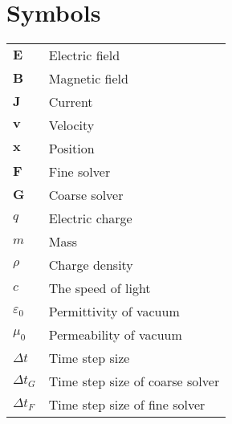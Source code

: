 \documentclass[master=wit, english]{kulemt}
\begin{document}
\section*{Symbols}
\begin{flushleft}
  \renewcommand{\arraystretch}{1.1}
  \begin{tabularx}{\textwidth}{@{}p{12mm}X@{}}
    $\textbf{E}$    & Electric field \\
    $\textbf{B}$   & Magnetic field \\
    $\textbf{J}$ & Current\\
    $\textbf{v}$   & Velocity \\
    $\textbf{x}$   & Position \\
    $\textbf{F}$ & Fine solver \\
    $\textbf{G}$ & Coarse solver \\
    $q$ & Electric charge\\
    $m$ & Mass\\
    $\rho$ & Charge density\\
    $c$ & The speed of light\\
    $\varepsilon_0$ & Permittivity of vacuum\\
    $\mu_0$ & Permeability of vacuum\\
    $\Delta t$ & Time step size\\
    $\Delta t_G$ & Time step size of coarse solver\\
    $\Delta t_F$ & Time step size of fine solver\\
    
  \end{tabularx}
\end{flushleft}

\newcommand{\pjd}[1]{{{\color{blue} #1}}}
\newcommand{\bram}[1]{{{\color{red} #1}}}

\mainmatter







\appendixpage*          %
\appendix




\backmatter


\end{document}
